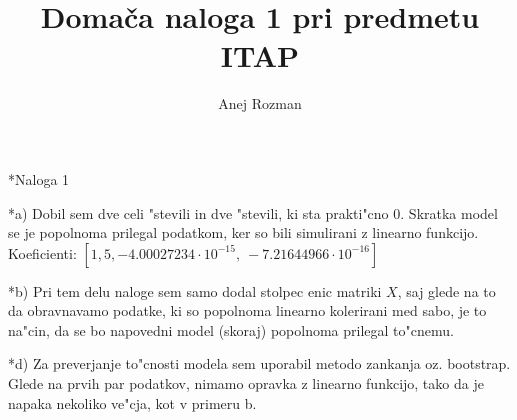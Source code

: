 \documentclass[a4paper, 10pt]{article}
\begin{document}
\title{Domača naloga 1 pri predmetu ITAP}
\author{Anej Rozman}
\date{}
\maketitle

\begin{subsection}*{Naloga 1}

    \begin{subsubsection}*{a)}
        Dobil sem dve celi "stevili in dve "stevili, ki sta prakti"cno $0$. Skratka 
        model se je popolnoma prilegal podatkom, ker so bili simulirani z linearno funkcijo. 
        \newline
        Koeficienti: $[ 1,   5, -4.00027234\cdot 10^{-15}, \ -7.21644966\cdot10^{-16}]$
    \end{subsubsection}

    \begin{subsubsection}*{b)}
        Pri tem delu naloge sem samo dodal stolpec enic matriki $X$, saj glede na to da obravnavamo 
        podatke, ki so popolnoma linearno kolerirani med sabo, je to na"cin, da se bo napovedni model
        (skoraj) popolnoma prilegal to"cnemu.
    \end{subsubsection}

    \begin{subsubsection}*{d)}
        Za preverjanje to"cnosti modela sem uporabil metodo zankanja oz. bootstrap. Glede na prvih par 
        podatkov, nimamo opravka z linearno funkcijo, tako da je napaka nekoliko ve"cja, kot v primeru b.
    \end{subsubsection}

\end{subsection}
\end{document}
